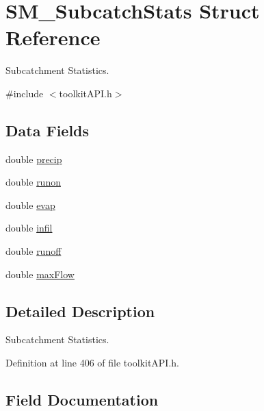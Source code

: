 \hypertarget{struct_s_m___subcatch_stats}{}\section{S\+M\+\_\+\+Subcatch\+Stats Struct Reference}
\label{struct_s_m___subcatch_stats}


Subcatchment Statistics.  




{\ttfamily \#include $<$toolkit\+A\+P\+I.\+h$>$}

\subsection*{Data Fields}
\begin{DoxyCompactItemize}
\item 
double \hyperlink{struct_s_m___subcatch_stats_a98bbe0990fa7260a158db1f443480e86}{precip}
\item 
double \hyperlink{struct_s_m___subcatch_stats_ac05f157303936535978c7e69f6dfb16f}{runon}
\item 
double \hyperlink{struct_s_m___subcatch_stats_aac3c1df7592191453d2ff02e5ff1b7e6}{evap}
\item 
double \hyperlink{struct_s_m___subcatch_stats_a6cd5b8d39e713bd1618a254d53def9b2}{infil}
\item 
double \hyperlink{struct_s_m___subcatch_stats_a4dcd362194c38698fe8f5b2659ba2dc6}{runoff}
\item 
double \hyperlink{struct_s_m___subcatch_stats_a4d84bca5454f3903c44fe865e44674f5}{max\+Flow}
\end{DoxyCompactItemize}


\subsection{Detailed Description}
Subcatchment Statistics. 

Definition at line 406 of file toolkit\+A\+P\+I.\+h.



\subsection{Field Documentation}
\mbox{\label{struct_s_m___subcatch_stats_aac3c1df7592191453d2ff02e5ff1b7e6}} 
